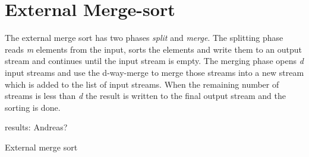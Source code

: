 \section{External Merge-sort}
The external merge sort has two phases \textit{split} and \textit{merge}. The splitting phase reads \textit{m} elements from the input, sorts the elements and write them to an output stream and continues until the input stream is empty. The merging phase opens \textit{d} input streams and use the d-way-merge to merge those streams into a new stream which is added to the list of input streams. When the remaining number of streams is less than \textit{d} the result is written to the final output stream and the sorting is done.

results: Andreas? 

External merge sort


